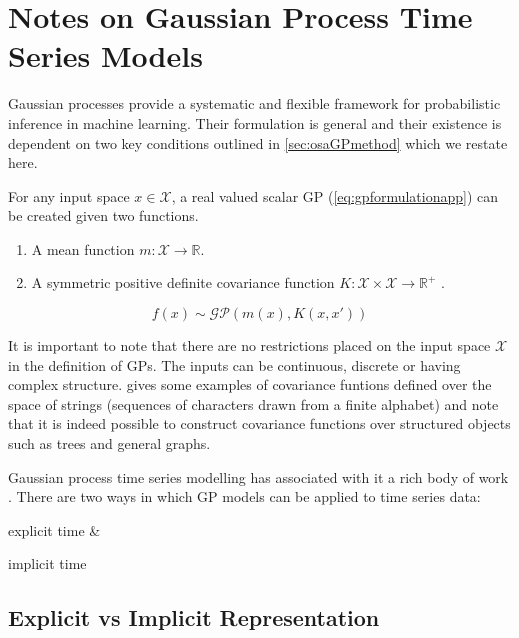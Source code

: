 \chapter{Notes on Gaussian Process Time Series Models}\label{app:gpNARX}

Gaussian processes provide a systematic and flexible framework for probabilistic inference in machine learning. 
Their formulation is general and their existence is dependent on two key conditions outlined in \cref{sec:osaGPmethod} 
which we restate here.

For any input space $x \in \mathcal{X}$, a real valued scalar GP (\cref{eq:gpformulationapp}) can be created given two functions.

\begin{enumerate}
    \item A mean function $m: \mathcal{X} \longrightarrow \mathbb{R}$.
    \item A symmetric positive definite covariance function $K: \mathcal{X} \times \mathcal{X} \longrightarrow \mathbb{R}^{+}$ \citep[ch.~1\&2]{Berlinet2004}.
\end{enumerate}    

\begin{equation}\label{eq:gpformulationapp}
    f(x) \sim \mathcal{GP}(m(x), K(x, x'))
\end{equation}

It is important to note that there are no restrictions placed on the input space $\mathcal{X}$ in the definition of GPs. The inputs 
can be continuous, discrete or having complex structure. \citet[ch.~4, sec.~4.4]{Rasmussen:2005:GPM:1162254} gives some examples of 
covariance funtions defined over the space of strings (sequences of characters drawn from a finite alphabet) and note that it is indeed 
possible to construct covariance functions over structured objects such as trees and general graphs. 

Gaussian process time series modelling has associated with it a rich body of work \citep{turner2012gaussian,frigola2016bayesian}. There 
are two ways in which GP models can be applied to time series data: \begin{enumerate*} \item explicit time \& \item implicit time \end{enumerate*}

\section*{Explicit vs Implicit Representation}

